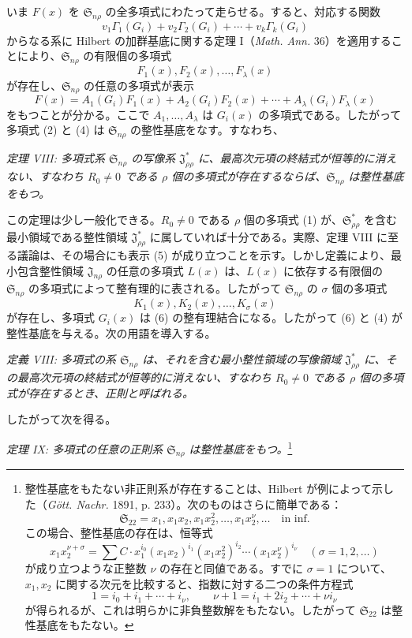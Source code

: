 \documentclass[11pt]{jlreq}
\providecommand{\Ssys}{\mathfrak{S}}
\providecommand{\Jdom}{\mathfrak{J}}
\begin{document}
いま $F(x)$ を $\Ssys_{n\rho}$ の全多項式にわたって走らせる。すると、対応する関数
\[
  v_1\Gamma_1(G_i)+v_2\Gamma_2(G_i)+\cdots+v_k\Gamma_k(G_i)
\]
からなる系に Hilbert の加群基底に関する定理 I（\emph{Math. Ann.} 36）を適用することにより、$\Ssys_{n\rho}$ の有限個の多項式
\begin{equation}
  F_1(x),F_2(x),\ldots,F_\lambda(x)
\tag{4}
\end{equation}
が存在し、$\Ssys_{n\rho}$ の任意の多項式が表示
\begin{equation}
  F(x)=A_1(G_i)F_1(x)+A_2(G_i)F_2(x)+\cdots+A_\lambda(G_i)F_\lambda(x)
\tag{5}
\end{equation}
をもつことが分かる。ここで $A_1,\ldots,A_\lambda$ は $G_i(x)$ の多項式である。したがって多項式 (2) と (4) は $\Ssys_{n\rho}$ の整性基底をなす。すなわち、

\emph{定理 VIII: 多項式系 $\Ssys_{n\rho}$ の写像系 $\Jdom^*_{\rho\rho}$ に、最高次元項の終結式が恒等的に消えない、すなわち $R_0\ne0$ である $\rho$ 個の多項式が存在するならば、$\Ssys_{n\rho}$ は整性基底をもつ。}

この定理は少し一般化できる。$R_0\ne0$ である $\rho$ 個の多項式 (1) が、$\Ssys^*_{\rho\rho}$ を含む最小領域である整性領域 $\Jdom^*_{\rho\rho}$ に属していれば十分である。実際、定理 VIII に至る議論は、その場合にも表示 (5) が成り立つことを示す。しかし定義により、最小包含整性領域 $\Jdom_{n\rho}$ の任意の多項式 $L(x)$ は、$L(x)$ に依存する有限個の $\Ssys_{n\rho}$ の多項式によって整有理的に表される。したがって $\Ssys_{n\rho}$ の $\sigma$ 個の多項式
\begin{equation}
  K_1(x),K_2(x),\ldots,K_\sigma(x)
\tag{6}
\end{equation}
が存在し、多項式 $G_i(x)$ は (6) の整有理結合になる。したがって (6) と (4) が整性基底を与える。次の用語を導入する。

\emph{定義 VIII: 多項式の系 $\Ssys_{n\rho}$ は、それを含む最小整性領域の写像領域 $\Jdom^*_{\rho\rho}$ に、その最高次元項の終結式が恒等的に消えない、すなわち $R_0\ne0$ である $\rho$ 個の多項式が存在するとき、正則と呼ばれる。}

したがって次を得る。

\emph{定理 IX: 多項式の任意の正則系 $\Ssys_{n\rho}$ は整性基底をもつ。}\footnote{整性基底をもたない非正則系が存在することは、Hilbert が例によって示した（\emph{Gött. Nachr.} 1891, p. 233）。次のものはさらに簡単である：
\[
  \Ssys_{22}=x_1,
  x_1x_2,
  x_1x_2^2,
  \ldots,
  x_1x_2^\nu,
  \ldots\quad\text{in inf.}
\]
この場合、整性基底の存在は、恒等式
\[
  x_1x_2^{\nu+\sigma}=\sum C\cdot x_1^{i_0}(x_1x_2)^{i_1}(x_1x_2^2)^{i_2}\cdots(x_1x_2^\nu)^{i_\nu}
  \quad(\sigma=1,2,\ldots)
\]
が成り立つような正整数 $\nu$ の存在と同値である。すでに $\sigma=1$ について、$x_1,x_2$ に関する次元を比較すると、指数に対する二つの条件方程式
\[
  1=i_0+i_1+\cdots+i_\nu,
  \qquad
  \nu+1=i_1+2i_2+\cdots+\nu i_\nu
\]
が得られるが、これは明らかに非負整数解をもたない。したがって $\Ssys_{22}$ は整性基底をもたない。}
\end{document}
